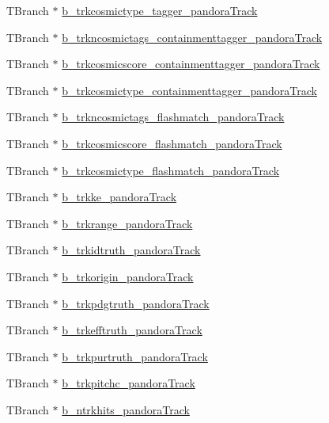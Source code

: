 \begin{DoxyCompactItemize}
T\-Branch $\ast$ \hyperlink{classanatree_a2ad042b0c5fb7ec3e96e9da8037119f4}{b\-\_\-trkcosmictype\-\_\-tagger\-\_\-pandora\-Track}
\item 
T\-Branch $\ast$ \hyperlink{classanatree_a96205e309f975ee102c33cb8b84e324c}{b\-\_\-trkncosmictags\-\_\-containmenttagger\-\_\-pandora\-Track}
\item 
T\-Branch $\ast$ \hyperlink{classanatree_af4c33dc332c24a2b75dcdef4cd9d4e10}{b\-\_\-trkcosmicscore\-\_\-containmenttagger\-\_\-pandora\-Track}
\item 
T\-Branch $\ast$ \hyperlink{classanatree_aaa3c883252cdaf10fb0deddf5c8a83c9}{b\-\_\-trkcosmictype\-\_\-containmenttagger\-\_\-pandora\-Track}
\item 
T\-Branch $\ast$ \hyperlink{classanatree_ab116c8b3fa8f5b41fef9521a63f1760d}{b\-\_\-trkncosmictags\-\_\-flashmatch\-\_\-pandora\-Track}
\item 
T\-Branch $\ast$ \hyperlink{classanatree_a3321e189e7b2ec484e2be9d93374eaf1}{b\-\_\-trkcosmicscore\-\_\-flashmatch\-\_\-pandora\-Track}
\item 
T\-Branch $\ast$ \hyperlink{classanatree_acebcf60585925122544cbe6aa3383f17}{b\-\_\-trkcosmictype\-\_\-flashmatch\-\_\-pandora\-Track}
\item 
T\-Branch $\ast$ \hyperlink{classanatree_ad366d472a32e99ee6d30cfeb3cbd86a1}{b\-\_\-trkke\-\_\-pandora\-Track}
\item 
T\-Branch $\ast$ \hyperlink{classanatree_aa7d9036d8d92248e13100afced0b115b}{b\-\_\-trkrange\-\_\-pandora\-Track}
\item 
T\-Branch $\ast$ \hyperlink{classanatree_a2d6d7397cd6d0234946df824ea5ebfa0}{b\-\_\-trkidtruth\-\_\-pandora\-Track}
\item 
T\-Branch $\ast$ \hyperlink{classanatree_a1a5ee65d607fe38f9b2c219aad3fefb3}{b\-\_\-trkorigin\-\_\-pandora\-Track}
\item 
T\-Branch $\ast$ \hyperlink{classanatree_a656e8c06ac7283b3eb376f152a04b281}{b\-\_\-trkpdgtruth\-\_\-pandora\-Track}
\item 
T\-Branch $\ast$ \hyperlink{classanatree_a6546472f5d800c2482b89cb413cb9980}{b\-\_\-trkefftruth\-\_\-pandora\-Track}
\item 
T\-Branch $\ast$ \hyperlink{classanatree_af39e82004212f99644a3b15a4152e6a8}{b\-\_\-trkpurtruth\-\_\-pandora\-Track}
\item 
T\-Branch $\ast$ \hyperlink{classanatree_a8f41f7a2c36e4ffd56830daab869a2e9}{b\-\_\-trkpitchc\-\_\-pandora\-Track}
\item 
T\-Branch $\ast$ \hyperlink{classanatree_aa233fe3244e43fa21f61ff0d5eb366ba}{b\-\_\-ntrkhits\-\_\-pandora\-Track}

\end{DoxyCompactItemize}
